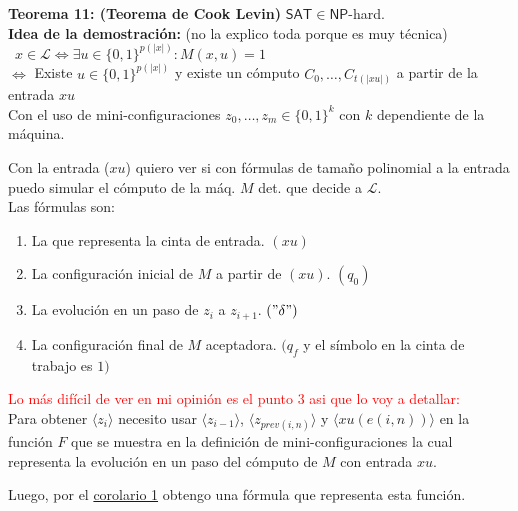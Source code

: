 \documentclass{article}
\begin{document}
\begin{flushleft}
  \textbf{Teorema 11: \hypertarget{cooklevin}{\textcolor{Bittersweet}{(Teorema de Cook Levin)}}}
  $\mathsf{SAT} \in \mathsf{NP}$-hard. \\[0.5em]

  \textcolor{Mulberry}{\textbf{Idea de la demostración:} \qquad (no la explico toda porque es muy 
  técnica)} \\[0.5em]

  \quad \ $x \in \mathcal{L} \iff \exists u \in \{ 0,1 \}^{p(|x|)} : M(x,u) = 1$ \\[0.5em]

  \qquad \qquad $\iff$ Existe $u \in \{ 0,1 \}^{p(|x|)}$ y existe un cómputo $C_0, \dots, C_{t(|xu|)}$ 
  a partir de la entrada $xu$ \\[0.5em]

  Con el uso de mini-configuraciones $z_0,\dots,z_m \in \{ 0,1 \}^k$ con $k$ dependiente de la máquina.

  Con la entrada ($xu$) quiero ver si con fórmulas de tamaño polinomial a la entrada puedo simular el 
  cómputo de la máq. $M$ det. que decide a $\mathcal{L}$. \\[0.5em]

  Las fórmulas son:
\end{flushleft}
\begin{enumerate}
  \item La que representa la cinta de entrada. \qquad $(xu)$
  \item La configuración inicial de $M$ a partir de $(xu)$. \qquad $(q_0)$
  \item La evolución en un paso de $z_i$ a $z_{i+1}$. \qquad $("\delta")$
  \item La configuración final de $M$ aceptadora. \qquad $(q_f$ y el símbolo en la cinta de trabajo es 
  $1)$
\end{enumerate}
\begin{flushleft}
  \textcolor{Red}{Lo más difícil de ver en mi opinión es el punto 3 asi que lo voy a detallar:} \\[0.5em]

  Para obtener $\langle z_i \rangle$ necesito usar $\langle z_{i-1} \rangle$, $\langle z_{prev(i,n)} 
  \rangle$ y $\langle xu(e(i,n)) \rangle$ en la función $F$ que se muestra en la definición de mini-configuraciones
  la cual representa la evolución en un paso del cómputo de $M$ con entrada $xu$.

  Luego, por el \textcolor{Rhodamine}{\hyperlink{cor1}{corolario 1}} obtengo una fórmula que representa 
  esta función.

\end{flushleft}
\end{document}
